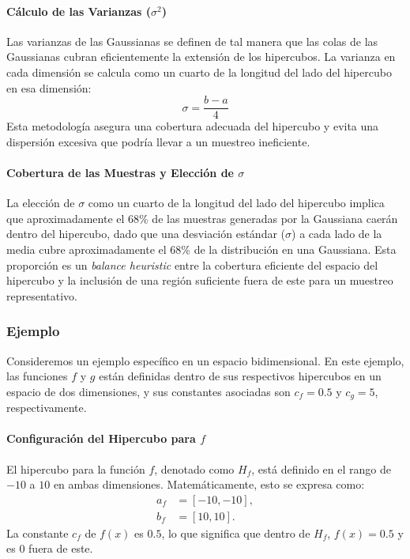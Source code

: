 \documentclass{article}
\begin{document}
\paragraph{Cálculo de las Varianzas (\( \sigma^2 \))}
Las varianzas de las Gaussianas se definen de tal manera que las colas de las Gaussianas cubran eficientemente la extensión de los hipercubos. La varianza en cada dimensión se calcula como un cuarto de la longitud del lado del hipercubo en esa dimensión:
$$
    \sigma = \frac{b - a}{4}
$$
Esta metodología asegura una cobertura adecuada del hipercubo y evita una dispersión excesiva que podría llevar a un muestreo ineficiente.

\paragraph{Cobertura de las Muestras y Elección de \( \sigma \)}
La elección de \( \sigma \) como un cuarto de la longitud del lado del hipercubo implica que aproximadamente el 68\% de las muestras generadas por la Gaussiana caerán dentro del hipercubo, dado que una desviación estándar (\( \sigma \)) a cada lado de la media cubre aproximadamente el 68\% de la distribución en una Gaussiana. Esta proporción es un \textit{balance heuristic} entre la cobertura eficiente del espacio del hipercubo y la inclusión de una región suficiente fuera de este para un muestreo representativo.

\subsubsection{Ejemplo}
Consideremos un ejemplo específico en un espacio bidimensional. En este ejemplo, las funciones \( f \) y \( g \) están definidas dentro de sus respectivos hipercubos en un espacio de dos dimensiones, y sus constantes asociadas son \( c_f = 0.5 \) y \( c_g = 5 \), respectivamente.

\paragraph{Configuración del Hipercubo para \( f \)}
El hipercubo para la función \( f \), denotado como \( H_f \), está definido en el rango de \(-10\) a \(10\) en ambas dimensiones. Matemáticamente, esto se expresa como:
\begin{align*}
    a_f &= [-10, -10], \\
    b_f &= [10, 10].
\end{align*}
La constante \( c_f \) de \( f(x) \) es \( 0.5 \), lo que significa que dentro de \( H_f \), \( f(x) = 0.5 \) y es \( 0 \) fuera de este.
\end{document}
